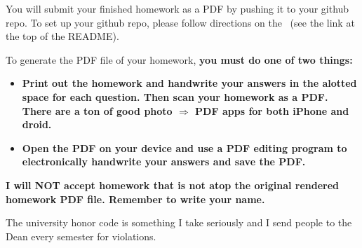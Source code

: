 


You will submit your finished homework as a PDF by pushing it to your github repo. To set up your github repo, please follow directions on the \coursewebpagelink~(see the link at the top of the README). 

To generate the PDF file of your homework, \textbf{you must do one of two things:}

\begin{itemize}
\item \textbf{Print out the homework and handwrite your answers in the alotted space for each question. Then scan your homework as a PDF. There are a ton of good photo $\Rightarrow$  PDF apps for both iPhone and droid. }
\item \textbf{Open the PDF on your device and use a PDF editing program to electronically handwrite your answers and save the PDF.}
\end{itemize}

\textbf{I will NOT accept homework that is not atop the original rendered homework PDF file. Remember to write your name.}

  The university honor code is something I take seriously and I send people to the Dean every semester for violations.